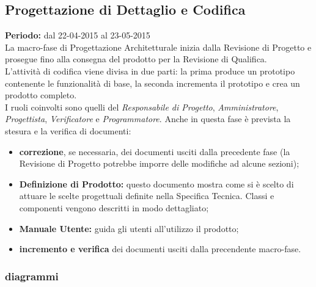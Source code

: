 \subsection{Progettazione di Dettaglio e Codifica}
\textbf{Periodo:} dal 22-04-2015 al 23-05-2015 \\
La macro-fase di Progettazione Architetturale inizia dalla Revisione di Progetto e prosegue fino alla consegna del prodotto per la Revisione di Qualifica. \\
L'attività di codifica viene divisa in due parti: la prima produce un prototipo contenente le funzionalità di base, la seconda incrementa il prototipo e crea un prodotto completo. \\
I ruoli coinvolti sono quelli del \textit{Responsabile di Progetto}, \textit{Amministratore}, \textit{Progettista}, \textit{Verificatore} e \textit{Programmatore}.
Anche in questa fase è prevista la stesura e la verifica di documenti:
\begin{itemize}
\item \textbf{correzione}, se necessaria, dei documenti usciti dalla precedente fase (la Revisione di Progetto potrebbe imporre delle modifiche ad alcune sezioni);
\item \textbf{Definizione di Prodotto:} questo documento mostra come si è scelto di attuare le scelte progettuali definite nella Specifica Tecnica. Classi e componenti vengono descritti in modo dettagliato;
\item \textbf{Manuale Utente:} guida gli utenti all'utilizzo il prodotto;
\item \textbf{incremento e verifica} dei documenti usciti dalla precendente macro-fase.
\end{itemize}

\newpage
\subsubsection{diagrammi}


